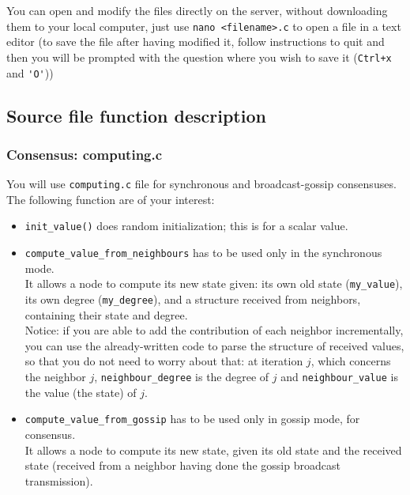 \documentclass{article}
\begin{document}
You can open and modify the files directly on the server, without downloading
them to your local computer, just use \verb=nano <filename>.c= to open a file in
a text editor (to save the file after having modified it, follow instructions to
quit and then you will be prompted with the question where you wish to save it
(\verb=Ctrl+x= and \verb='O'=))


\subsection{Source file function description}


\subsubsection{Consensus: computing.c}

You will use \verb=computing.c= file for synchronous and broadcast-gossip consensuses.
The following function are of your interest:

\begin{itemize}
	\item  \verb=init_value()= does random initialization; this is for a scalar value.
	\item \verb=compute_value_from_neighbours= has to be used only in the synchronous mode.\\
        It allows a node to compute its new state given: its own old state (\verb=my_value=),
        its own degree (\verb=my_degree=), and a structure received from neighbors,
        containing their state and degree.\\
        Notice: if you are able to add the
        contribution of each neighbor incrementally, you can use the
        already-written code to parse the structure of received values, so that
        you do not need to worry about that: at iteration $j$, which concerns
        the neighbor $j$, \verb=neighbour_degree= is the degree of $j$ and
        \verb=neighbour_value= is the value (the state) of $j$.
	\item \verb=compute_value_from_gossip= has to be used only in gossip mode, for consensus.\\
        It allows a node to compute its new state, given its old state and the received state
        (received from a neighbor having done the gossip broadcast transmission).
\end{itemize}
\end{document}
